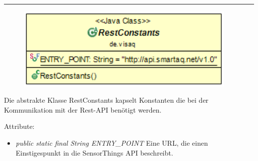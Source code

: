 \rule{\textwidth}{0.4pt}
\begin{minipage}{0.4\textwidth}
    \begin{figure}[H]
        {\centering\includegraphics[width=0.95\textwidth]{media/backend/modell/classes/RestConstants.png}}
    \end{figure}
    \end{minipage} \hfill
\begin{minipage}{0.6\textwidth}
    Die abstrakte Klasse RestConstants kapselt Konstanten die bei der Kommunikation mit der Rest-API benötigt werden.
\end{minipage}

Attribute:
\begin{itemize}
    \item \emph{public static final String ENTRY\_POINT} Eine URL, die einen Einstigespunkt in die \gls{SensorThings API} beschreibt.
\end{itemize}

